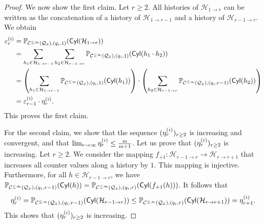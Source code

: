 \documentclass[a4paper,UKenglish,cleveref,autoref,thm-restate,colorlinks]{lipics-v2021}
\newcommand{\cyl}[1]{\mathsf{Cyl}(#1)}
\newcommand{\histPart}{\mathcal{H}}
\newcommand{\hist}{h}
\newcommand{\histConcat}[2]{#1\cdot{}#2}
\newcommand{\ocmdp}{\mathcal{Q}}
\newcommand{\ocState}{q}
\newcommand{\counterUB}{r}
\newcommand{\mchain}{\mathcal{C}}
\newcommand{\ocChainFin}[2]{\mchain^{\leq #2}(#1)}
\newcommand{\chainX}{\ocmdp_{\sqsxVect}}
\newcommand{\eleError}[1]{\varepsilon_{#1}}
\newcommand{\eleB}[1]{\eleError{#1}^{(\sqsi)}}
\newcommand{\eleD}[1]{\eta^{(\sqsi)}_{#1}}
\newcommand{\seqD}{(\eleD{\counterUB})_{\counterUB\geq 2}}
\begin{document}
\begin{proof}
  We now show the first claim.
  Let $\counterUB\geq 2$.
  All histories of $\histPart_{1\to\counterUB}$ can be written as the concatenation of a history of $\histPart_{1\to\counterUB-1}$ and a history of $\histPart_{\counterUB-1\to\counterUB}$.
  We obtain
  \begin{align*}
    \eleB{\counterUB}
    & = \probaMCverb{\ocChainFin{\chainX}{\infty}}{(\ocState_\sqsi, 1)}(\cyl{\histPart_{1\to\counterUB}}) \\
    & = \sum_{\hist_1\in\histPart_{1\to\counterUB-1}}\sum_{\hist_2\in\histPart_{\counterUB-1\to\counterUB}}\probaMCverb{\ocChainFin{\chainX}{\infty}}{(\ocState_\sqsi, 1)}(\cyl{\histConcat{\hist_1}{\hist_2}}) \\
    & = \left(\sum_{\hist_1\in\histPart_{1\to\counterUB-1}}\probaMCverb{\ocChainFin{\chainX}{\infty}}{(\ocState_\sqsi, 1)}(\cyl{\hist_1})\right)\cdot\left(\sum_{\hist_2\in\histPart_{\counterUB-1\to\counterUB}}\probaMCverb{\ocChainFin{\chainX}{\infty}}{(\ocState_\sqsi, \counterUB-1)}(\cyl{\hist_2})\right) \\
    & = \eleB{\counterUB-1}\cdot\eleD{\counterUB}.
  \end{align*}
  This proves the first claim.

  For the second claim, we show that the sequence $\seqD$ is increasing and convergent, and that $\lim_{\counterUB\to\infty}\eleD{\counterUB}\leq\frac{\sqsm}{\sqsm+1}$.
  Let us prove that $\seqD$ is increasing.
  Let $\counterUB\geq 2$.
  We consider the mapping $f_{+1}\colon\histPart_{\counterUB-1\to\counterUB}\to\histPart_{\counterUB\to\counterUB+1}$ that increases all counter values along a history by $1$.
  This mapping is injective.
  Furthermore, for all $\hist\in\histPart_{\counterUB-1\to\counterUB}$, we have $\probaMCverb{\ocChainFin{\chainX}{\infty}}{(\ocState_\sqsi, \counterUB-1)}(\cyl{\hist}) = \probaMCverb{\ocChainFin{\chainX}{\infty}}{(\ocState_\sqsi, \counterUB)}(\cyl{f_{+1}(\hist)})$.
  It follows that
  \[\eleD{\counterUB} =
    \probaMCverb{\ocChainFin{\chainX}{\infty}}{(\ocState_\sqsi, \counterUB-1)}(\cyl{\histPart_{\counterUB-1\to\counterUB}})  \leq
    \probaMCverb{\ocChainFin{\chainX}{\infty}}{(\ocState_\sqsi, \counterUB)}(\cyl{\histPart_{\counterUB\to\counterUB+1}}) =
    \eleD{\counterUB+1}.\]
  This shows that $\seqD$ is increasing.


\end{proof}
\end{document}

